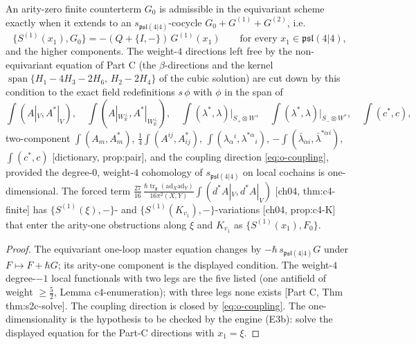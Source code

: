 \begin{proposition}
\label{prop:o-arity0}
An arity-zero finite counterterm $G_0$ is admissible in the equivariant scheme exactly when it extends to an $s_{\mathfrak{psl}(4|4)}$-cocycle $G_0+G^{(1)}+G^{(2)}$, i.e.
\[
\{S^{(1)}(x_1),G_0\}=-(Q+\{I,-\})\,G^{(1)}(x_1)\qquad\text{for every }x_1\in\mathfrak{psl}(4|4),
\]
and the higher components. The weight-$4$ directions left free by the non-equivariant equation of Part C (the $\beta$-directions and the kernel $\operatorname{span}\{H_1-4H_3-2H_6,\,H_2-2H_4\}$ of the cubic solution) are cut down by this condition to the exact field redefinitions $s\,\phi$ with $\phi$ in the span of
\[
\int(A|_V,A^*|_V),\quad \int(A|_{W_{\mathbb R}^\perp},A^*|_{W_{\mathbb R}^\perp}),\quad \int(\lambda^*,\lambda)\big|_{S_+\otimes W},\quad \int(\lambda^*,\lambda)\big|_{S_-\otimes W^*},\quad \int(c^*,c),
\]
two-component $\int(A_m,A^*_m)$, $\tfrac14\int(A^{ij},A^*_{ij})$, $\int(\lambda_\alpha{}^i,\lambda^{*\alpha}{}_i)$, $-\int(\bar\lambda_{\dot\alpha i},\bar\lambda^{*\dot\alpha i})$, $\int(c^*,c)$ [dictionary, prop:pair], and the coupling direction \eqref{eq:o-coupling}, provided the degree-$0$, weight-$4$ cohomology of $s_{\mathfrak{psl}(4|4)}$ on local cochains is one-dimensional. The forced term $\tfrac{27}{16}\,\frac{\hbar\operatorname{tr}_{\mathfrak g}(\mathrm{ad}_X\mathrm{ad}_Y)}{16\pi^2(X,Y)}\int(d^*A|_V,d^*A|_V)$ [ch04, thm:c4-finite] has $\{S^{(1)}(\xi),-\}$- and $\{S^{(1)}(K_{v_1}),-\}$-variations [ch04, prop:c4-K] that enter the arity-one obstructions along $\xi$ and $K_{v_1}$ as $\{S^{(1)}(x_1),F_0\}$.
\end{proposition}

\begin{proof}
The equivariant one-loop master equation changes by $-\hbar\,s_{\mathfrak{psl}(4|4)}G$ under $F\mapsto F+\hbar G$; its arity-one component is the displayed condition. The weight-$4$ degree-$-1$ local functionals with two legs are the five listed (one antifield of weight $\ge\tfrac52$, Lemma c4-enumeration); with three legs none exists [Part C, Thm thm:s2c-solve]. The coupling direction is closed by \eqref{eq:o-coupling}. The one-dimensionality is the hypothesis to be checked by the engine (E3b): solve the displayed equation for the Part-C directions with $x_1=\xi$.
\end{proof}

